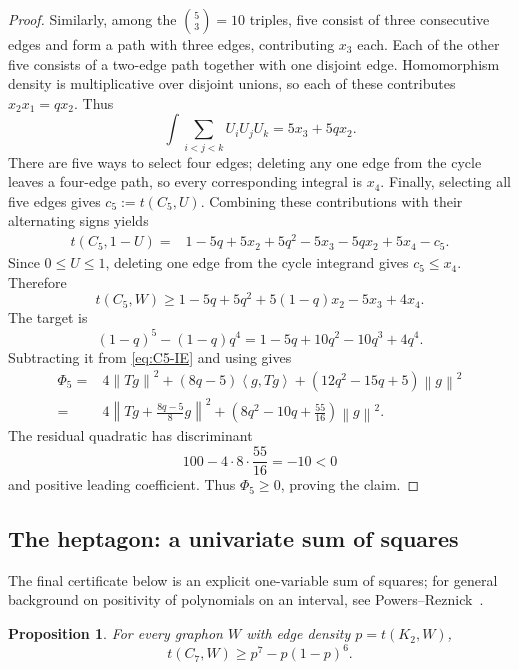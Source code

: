 \documentclass[11pt]{article}
\newtheorem{proposition}[theorem]{Proposition}
\newcommand{\ip}[2]{\left\langle #1,#2\right\rangle}
\newcommand{\norm}[1]{\left\lVert #1\right\rVert}
\begin{document}
\begin{proof}
Similarly, among the \(\binom53=10\) triples, five consist of three
consecutive edges and form a path with three edges, contributing \(x_3\)
each.  Each of the other five consists of a two-edge path together with one
disjoint edge.  Homomorphism density is multiplicative over disjoint unions,
so each of these contributes \(x_2x_1=qx_2\).  Thus
\[
       \int\sum_{i<j<k}U_iU_jU_k=5x_3+5qx_2.
\]
There are five ways to select four edges; deleting any one edge from the
cycle leaves a four-edge path, so every corresponding integral is \(x_4\).
Finally, selecting all five edges gives \(c_5:=t(C_5,U)\).  Combining these
contributions with their alternating signs yields
\[
\begin{aligned}
 t(C_5,1-U)
  ={}&1-5q+5x_2+5q^2-5x_3-5qx_2+5x_4-c_5.
\end{aligned}
\]
Since \(0\le U\le1\), deleting one edge from the cycle integrand gives
\(c_5\le x_4\).  Therefore
\begin{equation}\label{eq:C5-IE}
 t(C_5,W)\ge1-5q+5q^2+5(1-q)x_2-5x_3+4x_4.
\end{equation}
The target is
\[
 (1-q)^5-(1-q)q^4=1-5q+10q^2-10q^3+4q^4.
\]
Subtracting it from \eqref{eq:C5-IE} and using
 gives
\begin{equation}\label{eq:Phi5}
\begin{aligned}
 \Phi_5={}&4\norm{Tg}^2+(8q-5)\ip g{Tg}
        +(12q^2-15q+5)\norm g^2\\
 ={}&4\left\|Tg+\frac{8q-5}{8}g\right\|^2
   +\left(8q^2-10q+\frac{55}{16}\right)\norm g^2.
\end{aligned}
\end{equation}
The residual quadratic has discriminant
\[
       100-4\cdot8\cdot\frac{55}{16}=-10<0
\]
and positive leading coefficient.  Thus \(\Phi_5\ge0\), proving the claim.
\end{proof}

\subsection{The heptagon: a univariate sum of squares}\label{subsec:C7}

The final certificate below is an explicit one-variable sum of squares; for
general background on positivity of polynomials on an interval, see
Powers--Reznick~\cite{PowersReznick2000}.

\begin{proposition}\label{prop:C7}
For every graphon \(W\) with edge density \(p=t(K_2,W)\),
\[
       t(C_7,W)\ge p^7-p(1-p)^6.
\]
\end{proposition}
\end{document}
